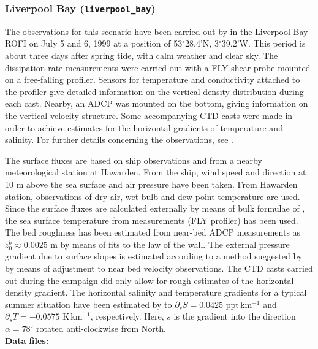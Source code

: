 \subsubsection{Liverpool Bay ({\tt liverpool\_bay})}\label{liverpool_bay}

The observations for this scenario
have been carried out by \cite{Rippethetal2001A} 
in the Liverpool Bay ROFI  on July 5 and 6, 1999 at a position
of 53$^{\circ}$28.4'N, 3$^{\circ}$39.2'W.
This period is about three days after spring tide,
with calm weather and clear sky.
The dissipation rate measurements were carried out with a FLY shear probe
mounted on a free-falling profiler. 
Sensors for temperature and conductivity attached to the profiler
give detailed information on the vertical density distribution
during each cast.
Nearby, an ADCP was mounted on the bottom, giving information on the
vertical velocity structure. Some accompanying CTD casts were made in
order to achieve estimates for the horizontal gradients of
temperature and salinity.   
For further details concerning the observations, see
\cite{Rippethetal2001A}. 

The surface fluxes are based on ship observations and from a
nearby meteorological station at Hawarden. From the ship,
wind speed  and direction at 10 m above the sea surface and
air pressure have been taken. From Hawarden station, observations of
dry air,
wet bulb and dew point temperature are used. Since the
surface fluxes
are calculated externally by means of 
bulk
formulae of \cite{Kondo75}, the sea surface temperature
from measurements (FLY profiler) 
has been used.
The bed roughness has been estimated from near-bed ADCP measurements
as $z_0^b\approx 0.0025$ m 
by means of fits to the law of the wall.
The external pressure gradient due to surface slopes is
estimated according to a method suggested by \cite{Burchard99}
by means of adjustment to near bed velocity observations.
The CTD casts carried out during the campaign did only allow for rough
estimates of the horizontal density gradient. 
The  
horizontal salinity and temperature gradients for a typical summer situation
have been estimated
by \cite{Sharples92} to $\partial_s S=0.0425$ ppt\,km$^{-1}$ and
$\partial_s T=-0.0575$ K\,km$^{-1}$, respectively. Here, $s$ is the
gradient into the direction $\alpha=78^{\circ}$ rotated
anti-clockwise from North.
\\ 

{\bf Data files:}

